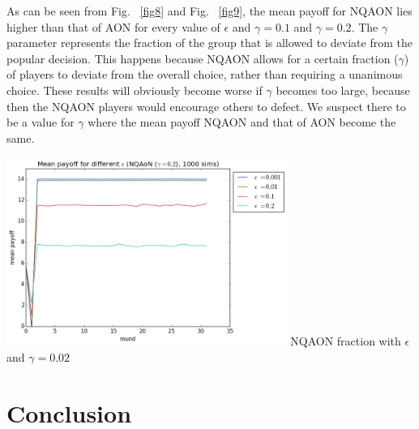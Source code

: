 \documentclass[letterpaper]{article}
\begin{document}
As can be seen from Fig. ~\ref{fig8} and Fig. ~\ref{fig9}, the mean payoff for NQAON lies higher than that of AON for every value of $\epsilon$ and $\gamma=0.1$ and $\gamma=0.2$. The $\gamma$ parameter represents the fraction of the group that is allowed to deviate from the popular decision. This happens because NQAON allows for a certain fraction ($\gamma$) of players to deviate from the overall choice, rather than requiring a unanimous choice. These results will obviously become worse if $\gamma$ becomes too large, because then the NQAON players would encourage others to defect. We suspect there to be a value for $\gamma$ where the mean payoff NQAON and that of AON become the same.


\includegraphics[width=3.6in,angle=0]{img/meanpayoff_epsilon_nqaongamma02.png}
 {NQAON fraction with $\epsilon$ and $\gamma=0.02$}
\label{fig9}
\vspace{3 mm}

\section{Conclusion}
\end{document}
